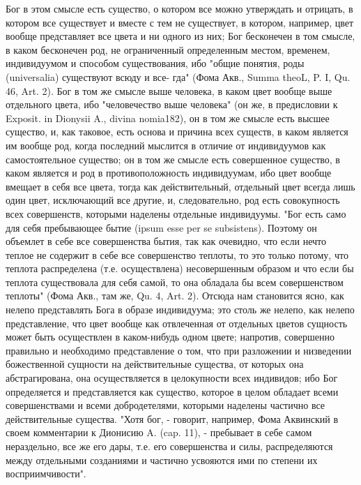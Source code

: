 \documentclass[12pt,oneside]{book}
\begin{document}
Бог в этом смысле есть существо, о котором все можно утверждать и отрицать, в котором все существует и вместе с тем не существует, в котором, например, цвет вообще представляет все цвета и ни одного из них; Бог бесконечен в том смысле, в каком бесконечен род, не ограниченный определенным местом, временем, индивидуумом и способом существования, ибо "общие понятия, роды (universalia) существуют всюду и все- гда" (Фома Акв., Summa theoL, P. I, Qu. 46, Art. 2). Бог в том же смысле выше человека, в каком цвет вообще выше отдельного цвета, ибо "человечество выше человека" (он же, в предисловии к Exposit. in Dionysii A., divina nomia182), он в том же смысле есть высшее существо, и, как таковое, есть основа и причина всех существ, в каком является им вообще род, когда последний мыслится в отличие от индивидуумов как самостоятельное существо; он в том же смысле есть совершенное существо, в каком является и род в противоположность индивидуумам, ибо цвет вообще вмещает в себя все цвета, тогда как действительный, отдельный цвет всегда лишь один цвет, исключающий все другие, и, следовательно, род есть совокупность всех совершенств, которыми наделены отдельные индивидуумы. "Бог есть само для себя пребывающее бытие (ipsum esse per se subsistens). Поэтому он объемлет в себе все совершенства бытия, так как очевидно, что если нечто теплое не содержит в себе все совершенство теплоты, то это только потому, что теплота распределена (т.е. осуществлена) несовершенным образом и что если бы теплота существовала для себя самой, то она обладала бы всем совершенством теплоты" (Фома Акв., там же, Qu. 4, Art. 2). Отсюда нам становится ясно, как нелепо представлять Бога в образе индивидуума; это столь же нелепо, как нелепо представление, что цвет вообще как отвлеченная от отдельных цветов сущность может быть осуществлен в каком-нибудь одном цвете; напротив, совершенно правильно и необходимо представление о том, что при разложении и низведении божественной сущности на действительные существа, от которых она абстрагирована, она осуществляется в целокупности всех индивидов; ибо Бог определяется и представляется как существо, которое в целом обладает всеми совершенствами и всеми добродетелями, которыми наделены частично все действительные существа. "Хотя бог, - говорит, например, Фома Аквинский в своем комментарии к Дионисию A. (cap. 11), - пребывает в себе самом нераздельно, все же его дары, т.е. его совершенства и силы, распределяются между отдельными созданиями и частично усвояются ими по степени их восприимчивости".

\bigskip
\end{document}
